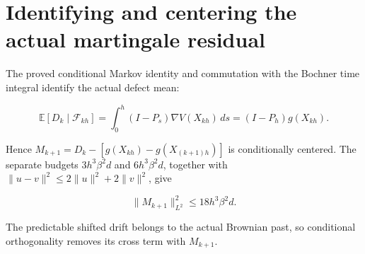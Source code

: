 \documentclass[11pt,a4paper]{report}
\begin{document}
\section{\texorpdfstring{Identifying and centering the actual martingale residual}{Identifying and centering the actual martingale residual}}


The proved conditional Markov identity and commutation with
    the Bochner time integral identify the actual defect mean:


    \[\mathbb E[D_k\mid\mathcal F_{kh}]
      =\int_0^h(I-P_s)\nabla V(X_{kh})\,ds
      =(I-P_h)g(X_{kh}).\]


Hence
    \(M_{k+1}=D_k-[g(X_{kh})-g(X_{(k+1)h})]\) is conditionally
    centered. The separate budgets \(3h^3\beta^2d\) and
    \(6h^3\beta^2d\), together with
    \(\|u-v\|^2\le2\|u\|^2+2\|v\|^2\), give


    \[\|M_{k+1}\|_{L^2}^2\le18h^3\beta^2d.\]


The predictable shifted drift belongs to the actual Brownian past,
    so conditional orthogonality removes its cross term with \(M_{k+1}\).
\end{document}
